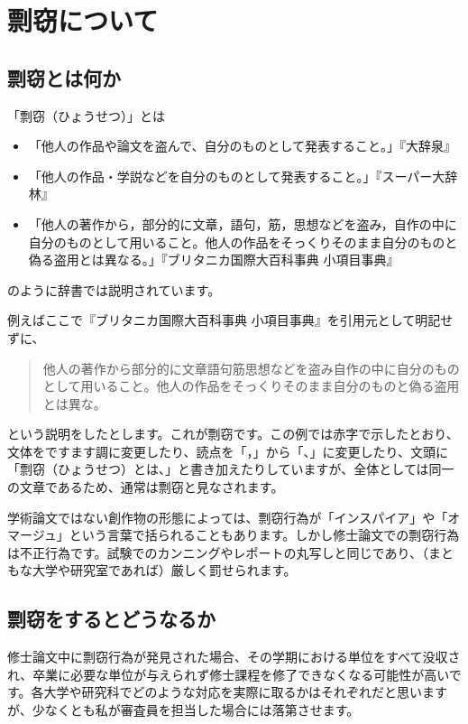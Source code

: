 \chapter{剽窃について}

\section{剽窃とは何か}
\label{sec:plagiarism}
「剽窃（ひょうせつ）」とは
\begin{itemize}
\item 「他人の作品や論文を盗んで、自分のものとして発表すること。」『大辞泉』
\item 「他人の作品・学説などを自分のものとして発表すること。」『スーパー大辞林』
\item 「他人の著作から，部分的に文章，語句，筋，思想などを盗み，自作の中に自分のものとして用いること。他人の作品をそっくりそのまま自分のものと偽る盗用とは異なる。」『ブリタニカ国際大百科事典 小項目事典』
\end{itemize}
のように辞書では説明されています。

例えばここで『ブリタニカ国際大百科事典 小項目事典』を引用元として明記せずに、
\begin{quotation}
  他人の著作から部分的に文章語句筋思想などを盗み自作の中に自分のものとして用いること。他人の作品をそっくりそのまま自分のものと偽る盗用とは異な。
\end{quotation}
という説明をしたとします。これが剽窃です。この例では赤字で示したとおり、文体をですます調に変更したり、読点を「，」から「、」に変更したり、文頭に「剽窃（ひょうせつ）とは、」と書き加えたりしていますが、全体としては同一の文章であるため、通常は剽窃と見なされます。

学術論文ではない創作物の形態によっては、剽窃行為が「インスパイア」や「オマージュ」という言葉で括られることもあります。しかし修士論文での剽窃行為は不正行為です。試験でのカンニングやレポートの丸写しと同じであり、（まともな大学や研究室であれば）厳しく罰せられます。

\section{剽窃をするとどうなるか}

修士論文中に剽窃行為が発見された場合、その学期における単位をすべて没収され、卒業に必要な単位が与えられず修士課程を修了できなくなる可能性が高いです。各大学や研究科でどのような対応を実際に取るかはそれぞれだと思いますが、少なくとも私が審査員を担当した場合には落第させます。


